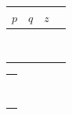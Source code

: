 \documentclass[letterpaper,10pt]{article}
\begin{document}
\begin{center}
	\begin{table}[H] 
		\Large 
		\setlength{\tabcolsep}{16pt}
		\renewcommand{\arraystretch}{1.5}
		\begin{tabular}{|c|c|c|p{5.25in}|} \hline 
			$p$ & $q$ & $z$ & \\ \hline
			\F & \F & \F & \\ \hline 		
			\F & \F & \T & \\ \hline 		
			\F & \T & \F & \\ \hline 		
			\F & \T & \T & \\ \hline
			\T & \F & \F & \\ \hline 		
			\T & \F & \T & \\ \hline
			\T & \T & \F & \\ \hline 		
			\T & \T & \T & \\ \hline												
		\end{tabular}
	\end{table}
	\vspace{.3in} 
	\begin{table}[H] 
		\Large 
	\renewcommand{\arraystretch}{1.5}
		\begin{tabular}{|p{\textwidth}|} \hline    \\ \hline	\\ \hline \\ \hline \\ \hline \\ \hline \\ \hline \\ \hline \\ \hline \\ \hline
		\end{tabular}
	\end{table}
\end{center}
\pagebreak
{} \vspace{-.1in}
\end{document}
